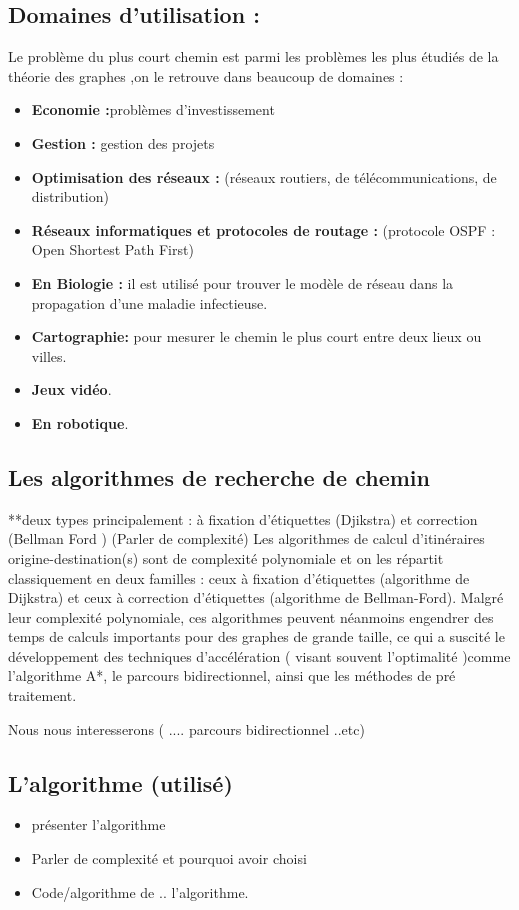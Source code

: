 \subsection{Domaines d'utilisation :}
Le problème du plus court chemin est parmi les problèmes les plus étudiés de la théorie des graphes ,on le retrouve dans beaucoup de domaines :
\begin{itemize}
\item\textbf{Economie :}problèmes d’investissement
\item\textbf{Gestion :} gestion des projets
\item\textbf{Optimisation des réseaux :} (réseaux routiers, de télécommunications, de distribution)
\item\textbf{Réseaux informatiques et protocoles de routage :} (protocole OSPF : Open Shortest Path First) 
\item\textbf{En Biologie :} il est utilisé pour trouver le modèle de réseau dans la propagation d'une maladie infectieuse.
\item\textbf{Cartographie:} pour mesurer le chemin le plus court entre deux lieux ou villes.
\item\textbf{Jeux vidéo}.
\item\textbf{En robotique}.
\end{itemize}

\subsection{Les algorithmes de recherche de chemin}
**deux types principalement : à fixation d'étiquettes (Djikstra) et correction  (Bellman Ford ) \newline
(Parler de complexité) \newline
Les algorithmes de calcul d'itinéraires origine-destination(s) sont de complexité polynomiale et on les répartit classiquement en deux familles : ceux à fixation d'étiquettes (algorithme de Dijkstra) et ceux à correction d'étiquettes (algorithme de Bellman-Ford).
Malgré leur complexité polynomiale, ces algorithmes peuvent néanmoins engendrer des temps de calculs importants pour des graphes de grande taille, ce qui a suscité le développement des techniques d'accélération (  visant souvent l'optimalité )comme l'algorithme A*, le parcours bidirectionnel, ainsi que les méthodes de pré traitement.

Nous nous interesserons ( .... parcours bidirectionnel ..etc) 

\subsection{L'algorithme (utilisé)}
\begin{itemize}
\item présenter l'algorithme
\item Parler de complexité et pourquoi avoir choisi
\item Code/algorithme de .. l'algorithme.
\end{itemize}

